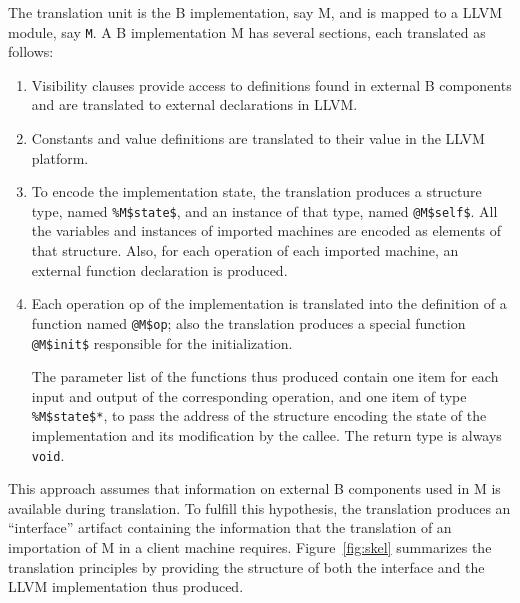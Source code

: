 \documentclass{llncs}
\newcommand{\llvm}[1]{\texttt{#1}}
\newcommand{\B}[1]{\textsf{#1}}
\begin{document}
The translation unit is the B implementation, say \B{M}, and is mapped to a LLVM
module, say \llvm{M}. A B implementation \B{M} has several sections, each
translated as follows:
\begin{enumerate}
\item Visibility clauses provide access to definitions found in external
  B components and are translated to external declarations in LLVM.
\item Constants and value definitions are translated to their value in the
  LLVM platform.
\item To encode the implementation state, the translation produces a
  structure type, named \llvm{\%M\$state\$}, and an instance of that type, named
  \llvm{@M\$self\$}. All the variables and instances of imported machines
  are encoded as elements of that structure.  Also, for each operation of each
  imported machine, an external function declaration is produced.
\item Each operation \B{op} of the implementation is translated into the
  definition of a function named \llvm{@M\$op}; also the translation produces a
  special function \llvm{@M\$init\$} responsible for the initialization.

  The parameter list of the functions thus produced contain one item for each
  input and output of the corresponding operation, and one item of type
  \llvm{\%M\$state\$*}, to pass the address of the structure encoding the
  state of the implementation and its modification by the callee. The return
  type is always \llvm{void}.
\end{enumerate}
This approach assumes that information on external B components used in \B{M} is
available during translation. To fulfill this hypothesis, the translation
produces an ``interface'' artifact containing the information that the
translation of an importation of \B{M} in a client machine
requires. Figure~\ref{fig:skel} summarizes the translation principles by
providing the structure of both the interface and the LLVM implementation thus
produced.
\end{document}
